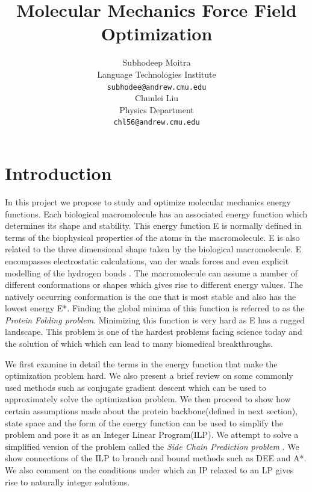 \documentclass{article} %
\title{Molecular Mechanics Force Field Optimization}
\author{
Subhodeep Moitra\\
Language Technologies Institute\\
\texttt{subhodee@andrew.cmu.edu} \\
\And
Chunlei Liu \\
Physics Department \\
\texttt{chl56@andrew.cmu.edu} 
}
\begin{document}
\maketitle

\section{Introduction}
In this project we propose to study and optimize molecular mechanics energy functions. Each biological macromolecule has an associated energy function which determines its shape and stability. This energy function E is normally defined in terms of the biophysical properties of the atoms in the macromolecule. E is also related to the three dimensional shape taken by the biological macromolecule. E encompasses electrostatic calculations, van der waals forces and even explicit modelling of the hydrogen bonds \cite{Boas2007}. The macromolecule can assume a number of different conformations or shapes which gives rise to different energy values. The natively occurring conformation is the one that is most stable and also has the lowest energy E*. Finding the global minima of this function is referred to as the \emph{Protein Folding problem}. Minimizing this function is very hard as E has a rugged landscape. This problem is one of the hardest problems facing science today and the solution of which which can lead to many biomedical breakthroughs. 

We first examine in detail the terms in the energy function that make the optimization problem hard. We also present a brief review on some commonly used methods such as conjugate gradient descent which can be used to approximately solve the optimization problem. We  then proceed to show how certain assumptions made about the protein backbone(defined in next section), state space and the form of the energy function can be used to simplify the problem and pose it as an Integer Linear Program(ILP). We attempt to solve a simplified version of the problem called the \emph{Side Chain Prediction problem} \cite{review_paper}. We show connections of the ILP to branch and bound methods such as DEE and A*. We also comment on the conditions under which an IP relaxed to an  LP gives rise to naturally integer solutions. 
\end{document}
